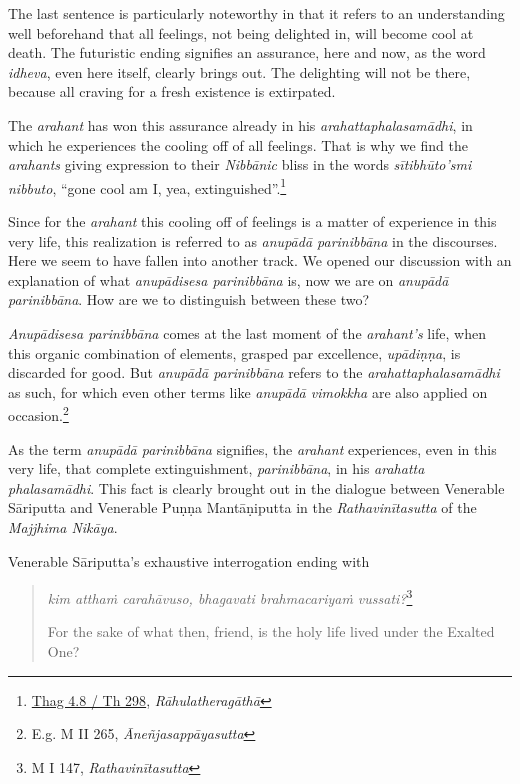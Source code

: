 The last sentence is particularly noteworthy in that it refers to an understanding well beforehand that all feelings, not being delighted in, will become cool at death. The futuristic ending signifies an assurance, here and now, as the word \emph{idheva}, even here itself, clearly brings out. The delighting will not be there, because all craving for a fresh existence is extirpated.

The \emph{arahant} has won this assurance already in his \emph{arahattaphalasamādhi}, in which he experiences the cooling off of all feelings. That is why we find the \emph{arahants} giving expression to their \emph{Nibbānic} bliss in the words \emph{sītibhūto'smi nibbuto}, ``gone cool am I, yea, extinguished''.\footnote{\href{https://suttacentral.net/thag4.8/pli/ms}{Thag 4.8 / Th 298}, \emph{Rāhulatheragāthā}}

Since for the \emph{arahant} this cooling off of feelings is a matter of experience in this very life, this realization is referred to as \emph{anupādā parinibbāna} in the discourses. Here we seem to have fallen into another track. We opened our discussion with an explanation of what \emph{anupādisesa parinibbāna} is, now we are on \emph{anupādā parinibbāna}. How are we to distinguish between these two?

\emph{Anupādisesa parinibbāna} comes at the last moment of the \emph{arahant's} life, when this organic combination of elements, grasped par excellence, \emph{upādiṇṇa}, is discarded for good. But \emph{anupādā parinibbāna} refers to the \emph{arahattaphalasamādhi} as such, for which even other terms like \emph{anupādā vimokkha} are also applied on occasion.\footnote{E.g. M II 265, \emph{Āneñjasappāyasutta}}

As the term \emph{anupādā parinibbāna} signifies, the \emph{arahant} experiences, even in this very life, that complete extinguishment, \emph{parinibbāna}, in his \emph{arahatta phalasamādhi}. This fact is clearly brought out in the dialogue between Venerable Sāriputta and Venerable Puṇṇa Mantāṇiputta in the \emph{Rathavinītasutta} of the \emph{Majjhima Nikāya}.

Venerable Sāriputta's exhaustive interrogation ending with

\begin{quote}
\emph{kim atthaṁ carahāvuso, bhagavati brahmacariyaṁ vussati?}\footnote{M I 147, \emph{Rathavinītasutta}}

For the sake of what then, friend, is the holy life lived under the Exalted One?
\end{quote}


